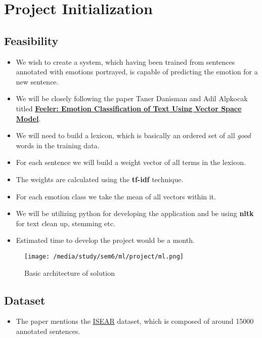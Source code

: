 \chapter{Project Initialization}
\section{Feasibility}
\label{sec-feasibility}
\begin{itemize}
\item We wish to create a system, which having been trained from sentences annotated with emotions portrayed, is capable of predicting the emotion for a new sentence.
\item We will be closely following the paper Taner Danisman and Adil Alpkocak titled \href{http://people.cs.deu.edu.tr/alpkocak/Papers/AISB08.pdf}{\textbf{Feeler: Emotion Classification of Text Using Vector Space Model}}.
\item We will need to build a lexicon, which is basically an ordered set of all \emph{good} words in the training data.
\item For each sentence we will build a weight vector of all terms in the lexicon.
\item The weights are calculated using the \textbf{tf-idf} technique.
\item For each emotion class we take the mean of all vectors within it.
\item We will be utilizing python for developing the application and be using \textbf{nltk} for text clean up, stemming etc.
\item Estimated time to develop the project would be a month.
\end{itemize}
\begin{center}
	\begin{figure}[ht!]
	\caption{Basic architecture of solution}
	\texttt{[image: /media/study/sem6/ml/project/ml.png]}
	\end{figure}
\end{center}
\section{Dataset}
\label{sec-dataset}
\begin{itemize}
\item The paper mentions the \href{https://github.com/bogdanneacsa/tts-master/blob/master/ISEAR/DATA.csv}{ISEAR} dataset, which is composed of around 15000 annotated sentences.
\end{itemize}
